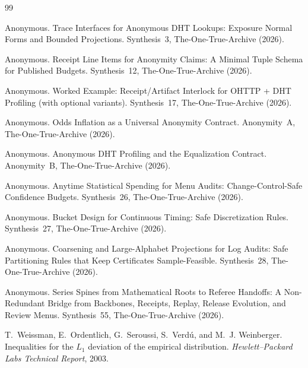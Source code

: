 \documentclass[11pt]{article}
\begin{document}
\begin{thebibliography}{99}\small

Anonymous.
\newblock Trace Interfaces for Anonymous DHT Lookups: Exposure Normal Forms and Bounded Projections.
\newblock Synthesis~3, The-One-True-Archive (2026).

Anonymous.
\newblock Receipt Line Items for Anonymity Claims: A Minimal Tuple Schema for Published Budgets.
\newblock Synthesis~12, The-One-True-Archive (2026).

Anonymous.
\newblock Worked Example: Receipt/Artifact Interlock for OHTTP + DHT Profiling (with optional variants).
\newblock Synthesis~17, The-One-True-Archive (2026).

Anonymous.
\newblock Odds Inflation as a Universal Anonymity Contract.
\newblock Anonymity~A, The-One-True-Archive (2026).

Anonymous.
\newblock Anonymous DHT Profiling and the Equalization Contract.
\newblock Anonymity~B, The-One-True-Archive (2026).

Anonymous.
\newblock Anytime Statistical Spending for Menu Audits: Change-Control-Safe Confidence Budgets.
\newblock Synthesis~26, The-One-True-Archive (2026).

Anonymous.
\newblock Bucket Design for Continuous Timing: Safe Discretization Rules.
\newblock Synthesis~27, The-One-True-Archive (2026).

Anonymous.
\newblock Coarsening and Large-Alphabet Projections for Log Audits: Safe Partitioning Rules that Keep Certificates Sample-Feasible.
\newblock Synthesis~28, The-One-True-Archive (2026).

Anonymous.
\newblock Series Spines from Mathematical Roots to Referee Handoffs: A Non-Redundant Bridge from Backbones, Receipts, Replay, Release Evolution, and Review Menus.
\newblock Synthesis~55, The-One-True-Archive (2026).

T.~Weissman, E.~Ordentlich, G.~Seroussi, S.~Verd\'u, and M.~J. Weinberger.
\newblock Inequalities for the $L_1$ deviation of the empirical distribution.
\newblock \emph{Hewlett--Packard Labs Technical Report}, 2003.

\end{thebibliography}
\end{document}
